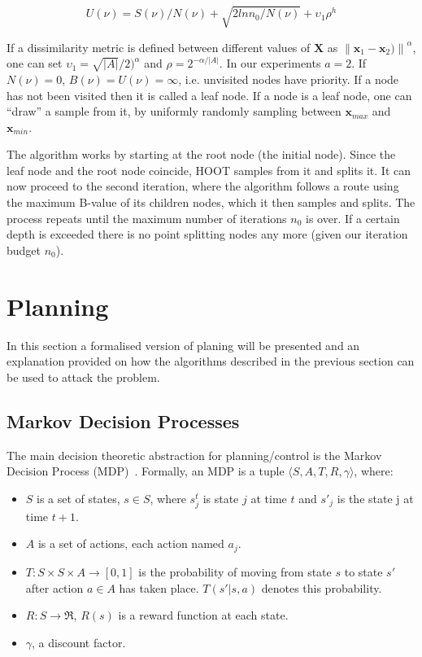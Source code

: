 \documentclass[conference]{IEEEtran}
\begin{document}
\begin{equation}
U(\nu) = S(\nu)/N(\nu) + \sqrt{2ln n_0/N(\nu)} + \upsilon_1 \rho^h
\label{eq:U}
\end{equation}



If a dissimilarity metric is defined between different values of $\bm{X}$ as ${\lVert \bm{x}_1 - \bm{x}_2) \rVert}^\alpha$, one can set $\upsilon_1 =\sqrt{|A|}/2)^\alpha$ and $\rho = 2^{-\alpha/|A|}$. In our experiments $a = 2$. If $N(\nu) = 0$, $B(\nu) = U(\nu) = \infty$, i.e. unvisited nodes have priority. If a node has not been visited then it is called a leaf node. If a node is a leaf node, one can ``draw'' a sample from it, by uniformly randomly sampling between $\bm{x_{\mathit{max}}}$ and $\bm{x_{\mathit{min}}}$.

The algorithm works by starting at the root node (the initial node). Since the leaf node and the root node coincide, HOOT samples from it and splits it. It can now proceed to the second iteration, where the algorithm follows a route using the maximum B-value of its children nodes, which it then samples and splits. The process repeats until the maximum number of iterations $n_0$ is over. If a certain depth is exceeded there is no point splitting nodes any more (given our iteration budget $n_0$). 



\section{Planning}  \label{sec:Planning}
In this section a formalised version of planing will be presented and an explanation provided on how the algorithms described in the previous section can be used to attack the problem.
\subsection{Markov Decision Processes}

The main decision theoretic abstraction for planning/control is the Markov Decision Process (MDP)~\cite{howard1960dynamic}. Formally,  an MDP is a tuple $\langle S,A,T,R,\gamma\rangle$, where:

\begin{itemize}
\item $S$ is a set of states, $s \in S$, where $s_j^t$ is state $j$ at time $t$ and $s'_j$ is the state j at time $t+1$.
\item $A$ is a set of actions, each action named $a_j$.
\item  $T:S \times S \times  A  \rightarrow [0,1]$ is the probability of moving from state $s$ to state $s'$  after action $a \in A$ has taken place. $T(s'|s,a)$ denotes this probability.
\item  $R:S \rightarrow \Re$, $R(s)$ is a reward function at each state.
\item $\gamma$, a discount factor.
\end{itemize}
\end{document}
